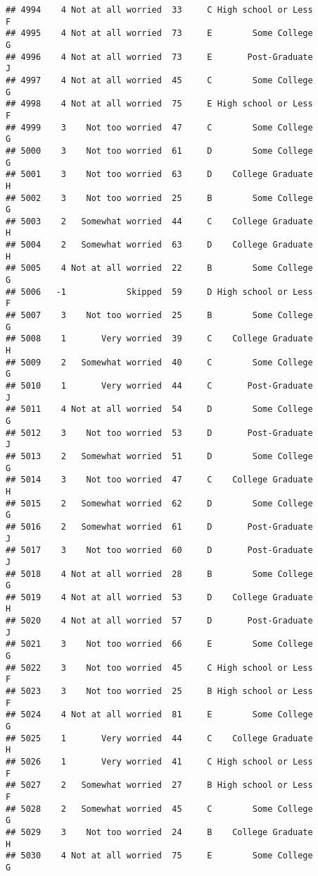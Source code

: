 \documentclass[
]{article}
\begin{document}
\begin{verbatim}
## 4994    4 Not at all worried  33     C High school or Less         F
## 4995    4 Not at all worried  73     E        Some College         G
## 4996    4 Not at all worried  73     E       Post-Graduate         J
## 4997    4 Not at all worried  45     C        Some College         G
## 4998    4 Not at all worried  75     E High school or Less         F
## 4999    3    Not too worried  47     C        Some College         G
## 5000    3    Not too worried  61     D        Some College         G
## 5001    3    Not too worried  63     D    College Graduate         H
## 5002    3    Not too worried  25     B        Some College         G
## 5003    2   Somewhat worried  44     C    College Graduate         H
## 5004    2   Somewhat worried  63     D    College Graduate         H
## 5005    4 Not at all worried  22     B        Some College         G
## 5006   -1            Skipped  59     D High school or Less         F
## 5007    3    Not too worried  25     B        Some College         G
## 5008    1       Very worried  39     C    College Graduate         H
## 5009    2   Somewhat worried  40     C        Some College         G
## 5010    1       Very worried  44     C       Post-Graduate         J
## 5011    4 Not at all worried  54     D        Some College         G
## 5012    3    Not too worried  53     D       Post-Graduate         J
## 5013    2   Somewhat worried  51     D        Some College         G
## 5014    3    Not too worried  47     C    College Graduate         H
## 5015    2   Somewhat worried  62     D        Some College         G
## 5016    2   Somewhat worried  61     D       Post-Graduate         J
## 5017    3    Not too worried  60     D       Post-Graduate         J
## 5018    4 Not at all worried  28     B        Some College         G
## 5019    4 Not at all worried  53     D    College Graduate         H
## 5020    4 Not at all worried  57     D       Post-Graduate         J
## 5021    3    Not too worried  66     E        Some College         G
## 5022    3    Not too worried  45     C High school or Less         F
## 5023    3    Not too worried  25     B High school or Less         F
## 5024    4 Not at all worried  81     E        Some College         G
## 5025    1       Very worried  44     C    College Graduate         H
## 5026    1       Very worried  41     C High school or Less         F
## 5027    2   Somewhat worried  27     B High school or Less         F
## 5028    2   Somewhat worried  45     C        Some College         G
## 5029    3    Not too worried  24     B    College Graduate         H
## 5030    4 Not at all worried  75     E        Some College         G

\end{verbatim}
\end{document}
